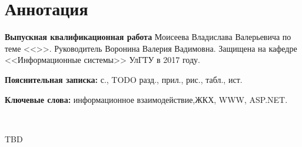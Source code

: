 
\section*{Аннотация}

\textbf{Выпускная квалификационная работа} Моисеева Владислава Валерьевича по теме <<\WorkName>>.
Руководитель Воронина Валерия Вадимовна.
Защищена на кафедре <<Информационные системы>> УлГТУ в 2017 году.

\textbf{Пояснительная записка:}  с.,  TODO разд.,  прил.,  рис.,  табл.,  ист.

\textbf{Ключевые слова:} информационное взаимодействие,\linebreak ЖКХ, WWW, ASP.NET. 

~

TBD

\clearpage
\newpage